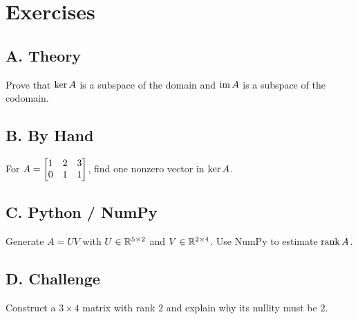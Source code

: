 \section*{Exercises}
\subsection*{A. Theory}
\begin{exercise} Prove that $\operatorname{ker} A$ is a subspace of the domain and $\operatorname{im} A$ is a subspace of the codomain. \end{exercise}
\subsection*{B. By Hand}
\begin{exercise} For $A=\begin{bmatrix}1&2&3\\0&1&1\end{bmatrix}$, find one nonzero vector in $\operatorname{ker} A$. \end{exercise}
\subsection*{C. Python / NumPy}
\begin{exercise} Generate $A=UV$ with $U\in\mathbb{R}^{5\times 2}$ and $V\in\mathbb{R}^{2\times 4}$. Use NumPy to estimate $\operatorname{rank} A$. \end{exercise}
\subsection*{D. Challenge}
\begin{exercise} Construct a $3\times 4$ matrix with rank $2$ and explain why its nullity must be $2$. \end{exercise}
